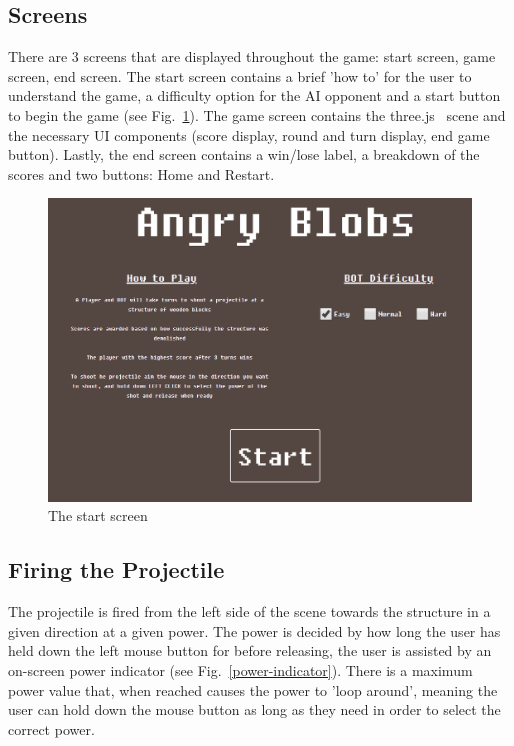 \documentclass[runningheads]{llncs}
\begin{document}
	\subsection{Screens}
	There are 3 screens that are displayed throughout the game: start screen, game screen, end screen. The start screen contains a brief 'how to' for the user to understand the game, a difficulty option for the AI opponent and a start button to begin the game (see Fig.~\ref{start-screen}). The game screen contains the three.js~\cite{ref_threejs} scene and the necessary UI components (score display, round and turn display, end game button). Lastly, the end screen contains a win/lose label, a breakdown of the scores and two buttons: Home and Restart.
	\begin{figure}
		\centering
		\includegraphics[width=\textwidth]{./img/start-screen.png}
		\caption{The start screen}
		\label{start-screen}
	\end{figure}
	\subsection{Firing the Projectile}\label{func_projectile}
	The projectile is fired from the left side of the scene towards the structure in a given direction at a given power. The power is decided by how long the user has held down the left mouse button for before releasing, the user is assisted by an on-screen power indicator (see Fig.~\ref{power-indicator}). There is a maximum power value that, when reached causes the power to 'loop around', meaning the user can hold down the mouse button as long as they need in order to select the correct power. 
	
\end{document}
